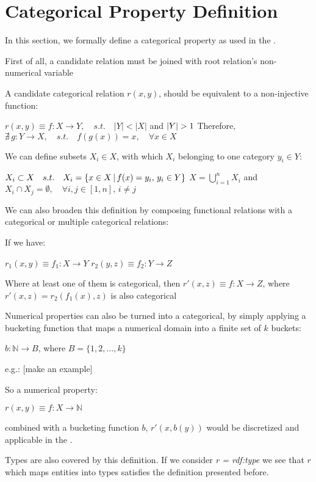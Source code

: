  
\section{Categorical Property Definition}

In this section, we formally define a categorical property as used in the \graphname. 

First of all, a candidate relation must be joined with root relation's non-numerical variable

A candidate categorical relation $r(x,y)$, should be equivalent to a non-injective function:

$r(x,y) \equiv f : X \rightarrow Y , \quad s.t. \quad |Y|<|X| $ and $ |Y|>1 \newline $
Therefore, $\nexists \, g : Y \rightarrow X , \quad s.t. \quad f(g(x))=x , \quad \forall x \in X$

We can define subsets $X_i \in X$, with which $X_i$ belonging to one category $y_i \in Y$:

$X_i \subset X \quad s.t. \quad X_i = \{x \in X \,|\, f(x)=y_i ,\, y_i \in Y\} \newline $
$X = \bigcup_{i=1}^{n} X_i $ and $ X_i \cap X_j = \emptyset ,\quad \forall i,j \in [1,n] ,\, i \neq j$

We can also broaden this definition by composing functional relations with a categorical or multiple categorical
relations:

If we have:

$r_1(x,y) \equiv f_1 : X \rightarrow Y$ \newline
$r_2(y,z) \equiv f_2 : Y \rightarrow Z$ 

Where at least one of them is categorical, then $r'(x,z) \equiv f : X \rightarrow Z$, where $r'(x,z)=r_2(f_1(x),z)$ is also categorical


Numerical properties can also be turned into a categorical, by simply applying a bucketing function that maps a
numerical domain into a finite set of $k$ buckets:

$b: \mathbb{N} \rightarrow B$, where $B=\{1,2,\dots ,k \}$

e.g.: [make an example]

So a numerical property:

$r(x,y) \equiv f : X \rightarrow \mathbb{N}$ 

combined with a bucketing function $b$, $r'(x,b(y))$ would be discretized and applicable in the \graphname.

Types are also covered by this definition. If we consider \emph{r = rdf:type} we see that $r$ which maps entities into
types satisfies the definition presented before.

